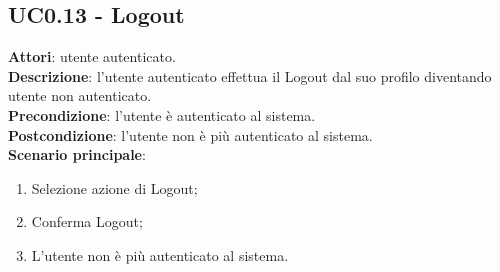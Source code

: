 \subsection{UC0.13 - Logout}{
	\label{uc0.13}
	\textbf{Attori}: utente autenticato.\\
	\textbf{Descrizione}: l'utente autenticato effettua il Logout dal suo profilo diventando utente non autenticato.\\
	\textbf{Precondizione}: l'utente è autenticato al sistema.\\
	\textbf{Postcondizione}: l'utente non è più autenticato al sistema.\\
	\textbf{Scenario principale}:
	\begin{enumerate}
		\item Selezione azione di Logout;
		\item Conferma Logout;
		\item L'utente non è più autenticato al sistema.
	\end{enumerate}
}